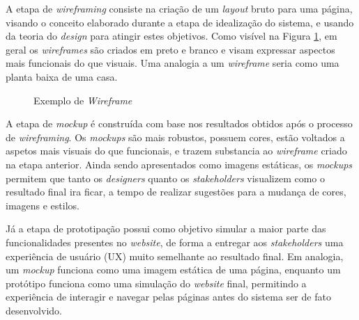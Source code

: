 A etapa de \emph{wireframing} consiste na criação de um \emph{layout}
bruto para uma página, visando o conceito elaborado durante a etapa
de idealização do sistema, e usando da teoria do \emph{design} para atingir
estes objetivos. Como visível na Figura \ref{fig:wireframe-exemple}, em geral os
\emph{wireframes} são criados em preto e branco e visam expressar aspectos mais
funcionais do que visuais. Uma analogia a um \emph{wireframe} seria como uma
planta baixa de uma casa.

\begin{figure}[H]
    \caption{Exemplo de \emph{Wireframe}}
    \centering
    \label{fig:wireframe-exemple}
\end{figure}

A etapa de \emph{mockup} é construída com base nos resultados obtidos após o
processo de \emph{wireframing}. Os \emph{mockups} são mais robustos, possuem
cores, estão voltados a aspetos mais visuais do que funcionais, e trazem substancia
ao \emph{wireframe} criado na etapa anterior. Ainda sendo apresentados como imagens
estáticas, os \emph{mockups} permitem que tanto os \emph{designers} quanto
os \emph{stakeholders} visualizem como o resultado final ira ficar, a tempo
de realizar sugestões para a mudança de cores, imagens e estilos.

Já a etapa de prototipação possui como objetivo simular
a maior parte das funcionalidades presentes no \emph{website},
de forma a entregar aos \emph{stakeholders} uma experiência de usuário (UX)
muito semelhante ao resultado final. Em analogia, um \emph{mockup} funciona
como uma imagem estática de uma página, enquanto um protótipo funciona
como uma simulação do \emph{website} final, permitindo a experiência de
interagir e navegar pelas páginas antes do sistema ser de fato desenvolvido.

